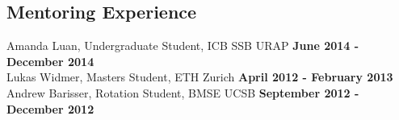 {%

\subsection*{Mentoring Experience}
Amanda Luan, Undergraduate Student, ICB SSB URAP \hfill {\bf June 2014 - December 2014} \\
Lukas Widmer, Masters Student, ETH Zurich \hfill {\bf April 2012 - February 2013} \\
Andrew Barisser, Rotation Student, BMSE UCSB \hfill {\bf September 2012 - December 2012}

}
